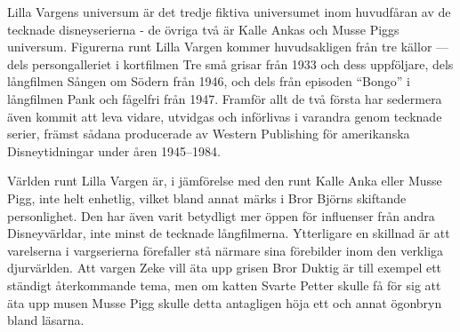 Lilla Vargens universum {\"a}r det tredje fiktiva universumet inom huvudf{\r{a}}ran av de
tecknade disneyserierna - de {\"o}vriga tv{\r{a}} {\"a}r Kalle Ankas och Musse Piggs
universum. Figurerna runt Lilla Vargen kommer huvudsakligen fr{\r{a}}n tre k{\"a}llor ---
dels persongalleriet i kortfilmen Tre sm{\r{a}} grisar fr{\r{a}}n 1933 och dess uppf{\"o}ljare,
dels l{\r{a}}ngfilmen S{\r{a}}ngen om S{\"o}dern fr{\r{a}}n 1946, och dels fr{\r{a}}n episoden ``Bongo'' i
l{\r{a}}ngfilmen Pank och f{\r{a}}gelfri fr{\r{a}}n 1947. Framf{\"o}r allt de tv{\r{a}} f{\"o}rsta har
sedermera {\"a}ven kommit att leva vidare, utvidgas och inf{\"o}rlivas i varandra genom
tecknade serier, fr{\"a}mst s{\r{a}}dana producerade av Western Publishing f{\"o}r
amerikanska Disneytidningar under {\r{a}}ren 1945--1984.

V{\"a}rlden runt Lilla Vargen {\"a}r, i j{\"a}mf{\"o}relse med den runt Kalle Anka eller Musse
Pigg, inte helt enhetlig, vilket bland annat m{\"a}rks i Bror Bj{\"o}rns skiftande
personlighet. Den har {\"a}ven varit betydligt mer {\"o}ppen f{\"o}r influenser fr{\r{a}}n andra
Disneyv{\"a}rldar, inte minst de tecknade l{\r{a}}ngfilmerna. Ytterligare en skillnad {\"a}r
att varelserna i vargserierna f{\"o}refaller st{\r{a}} n{\"a}rmare sina f{\"o}rebilder inom den
verkliga djurv{\"a}rlden. Att vargen Zeke vill {\"a}ta upp grisen Bror Duktig {\"a}r till
exempel ett st{\"a}ndigt {\r{a}}terkommande tema, men om katten Svarte Petter skulle f{\r{a}}
f{\"o}r sig att {\"a}ta upp musen Musse Pigg skulle detta antagligen h{\"o}ja ett och annat
{\"o}gonbryn bland l{\"a}sarna.
